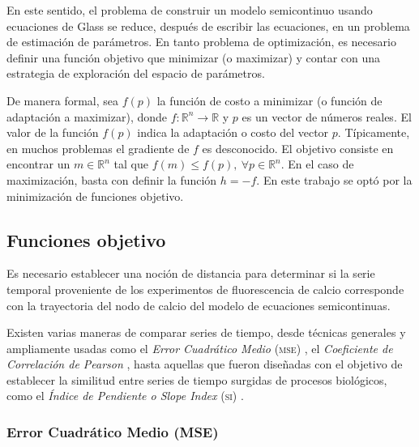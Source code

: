 En este sentido, el problema de construir un modelo semicontinuo usando ecuaciones de Glass se reduce, después de escribir las ecuaciones, en un problema de estimación de parámetros. En tanto problema de optimización, es necesario definir una función objetivo que minimizar (o maximizar) y contar con una estrategia de exploración del espacio de parámetros. 

De manera formal, sea $f(p)$ la función de costo a minimizar (o función de adaptación a maximizar), donde $f:\mathbb{R}^n\rightarrow \mathbb{R}$ y $p$ es un vector de números reales. El valor de la función $f(p)$ indica la adaptación o costo del vector $p$. Típicamente, en muchos problemas el gradiente de $f$ es desconocido. El objetivo consiste en encontrar un $m \in \mathbb{R}^n$ tal que $f(m) \le f(p),\ \forall p \in \mathbb{R}^n$. En el caso de maximización, basta con definir la función $h=-f$. En este trabajo se optó por la minimización de funciones objetivo.

\subsection{Funciones objetivo}

Es necesario establecer una noción de distancia para determinar si la serie temporal proveniente de los experimentos de fluorescencia de calcio corresponde con la trayectoria del nodo de calcio del modelo de ecuaciones semicontinuas.

Existen varias maneras de comparar series de tiempo, desde técnicas generales y ampliamente usadas como el \emph{Error Cuadrático Medio} \textsc{(mse)} \citep{msewiki}, el \emph{Coeficiente de Correlación de Pearson} \citep{pearsoncorrwiki}, hasta aquellas que fueron diseñadas con el objetivo de establecer la similitud entre series de tiempo surgidas de procesos biológicos, como el \emph{Índice de Pendiente o Slope Index} \textsc{(si)} \citeauthor{Cho2006} \citep{Cho2006}.%

\subsubsection{Error Cuadrático Medio (MSE)}


